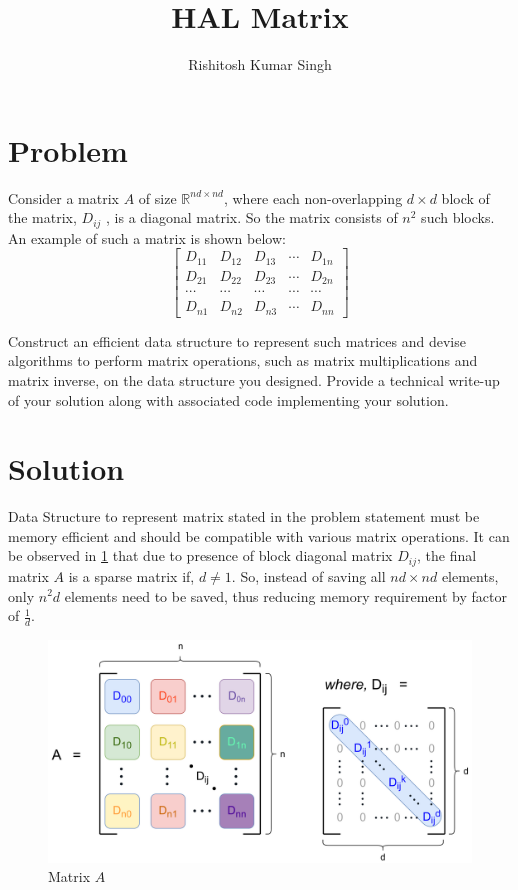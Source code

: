 \documentclass[11pt,twocolumn]{article}
\title{HAL Matrix}
\author{Rishitosh Kumar Singh}
\begin{document}
\maketitle

\section{Problem}
    Consider a matrix $A$ of size $\mathbb{R}^{nd \times nd}$, where each non-overlapping $d \times d$ block of the matrix, $D_{ij}$ , is a diagonal matrix. So the matrix consists of $n^2$ such blocks. An example of such a matrix is shown below:
    \begin{equation}
        \nonumber
        \begin{bmatrix} D_{11} & D_{12} & D_{13} & \cdots & D_{1n} \\ D_{21} & D_{22} & D_{23} & \cdots & D_{2n} \\ \cdots & \cdots & \cdots & \cdots & \cdots \\ D_{n1} & D_{n2} & D_{n3} & \cdots & D_{nn} \end{bmatrix}
    \end{equation}

    Construct an efficient data structure to represent such matrices and devise algorithms to perform matrix operations, such as matrix multiplications and matrix inverse, on the data structure you designed. Provide a technical write-up of your solution along with associated code implementing your solution.

\section{Solution}
    
    Data Structure to represent matrix stated in the problem statement must be memory efficient and should be compatible with various matrix operations. It can be observed in \cref{img:matrix} that due to presence of block diagonal matrix $D_{ij}$, the final matrix $A$ is a sparse matrix if, $d \neq 1$. So, instead of saving all $nd \times nd$ elements, only $n^2d$ elements need to be saved, thus reducing memory requirement by factor of $\frac{1}{d}$.

    \begin{figure}[H]
        \includegraphics[width=\linewidth]{images/matrix.png}
        \caption{Matrix $A$}
        \label{img:matrix}    
    \end{figure}
\end{document}

